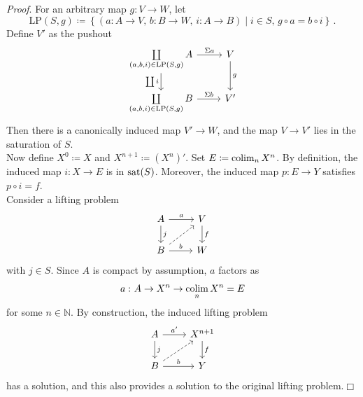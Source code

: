         \emph{Proof}. For an arbitrary map $g \colon V \to W$, let
        \begin{equation*}
            \mathrm{LP}(S, g) \coloneq \left\{ (a \colon A \to V, \, b \colon B \to W, \, i \colon A \to B) \mid i \in S, \, g \circ a = b \circ i \right\} \,.
        \end{equation*}
        Define $V'$ as the pushout
        \begin{equation*}
            \begin{tikzcd}
                \coprod\limits_{(a,b,i) \in \mathrm{LP}(S, g)}A \arrow[r, "\Sigma a"] \arrow[d, "\coprod i"'] & V \arrow[d, "g"] \\
                \coprod\limits_{(a,b,i) \in \mathrm{LP}(S, g)}B \arrow[r, "\Sigma b"] & V'
            \end{tikzcd}
        \end{equation*}
        Then there is a canonically induced map $V' \to W$, and the map $V \to V'$ lies in the saturation of $S$.\\
        Now define $X^0 \coloneq X$ and $X^{n+1} \coloneq (X^n)'$. Set $E \coloneq \operatorname*{colim}_n X^n$. By definition, the induced map $i \colon X \to E$ is in $\operatorname{sat}(S)$. Moreover, the induced map $p \colon E \to Y$ satisfies $p \circ i = f$.\\
        Consider a lifting problem
        \begin{equation*}
            \begin{tikzcd}
                A \arrow[r, "a"] \arrow[d, "j"] & V \arrow[d, "f"] \\
                B \arrow[ur, dashed] \arrow[r, "b"] & W
            \end{tikzcd}
        \end{equation*}
        with $j \in S$. Since $A$ is compact by assumption, $a$ factors as
        \begin{equation*}
            a \,\colon A \to X^n \to \operatorname*{colim}\limits_{n}X^n = E
        \end{equation*}
        for some $n \in \mathbb{N}$. By construction, the induced lifting problem
        \begin{equation*}
            \begin{tikzcd}
                A \arrow[r, "a'"] \arrow[d, "j"] & X^{n+1} \arrow[d, "f"] \\
                B \arrow[ur, dashed] \arrow[r, "b"] & Y
            \end{tikzcd}
        \end{equation*}
        has a solution, and this also provides a solution to the original lifting problem.\hfill$\Box$

